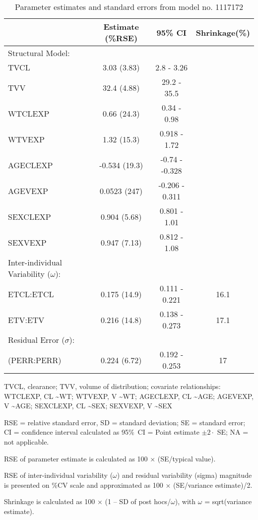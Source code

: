 \begin{table}[ht]
\begin{threeparttable}
\centering
\caption{Parameter estimates and standard errors from model no. 1117172} 
\label{tab:paramsum1117172}
\begingroup\small
\begin{tabular}{lccc}
  \hline
 & Estimate (\%RSE) & 95\% CI & Shrinkage(\%) \\ 
  \hline
Structural Model: &  &  &  \\ 
  TVCL & 3.03 (3.83) & 2.8 - 3.26 &  \\ 
  TVV & 32.4 (4.88) & 29.2 - 35.5 &  \\ 
  WTCLEXP & 0.66 (24.3) & 0.34 - 0.98 &  \\ 
  WTVEXP & 1.32 (15.3) & 0.918 - 1.72 &  \\ 
  AGECLEXP & -0.534 (19.3) & -0.74 - -0.328 &  \\ 
  AGEVEXP & 0.0523 (247) & -0.206 - 0.311 & \\ 
  SEXCLEXP & 0.904 (5.68) & 0.801 - 1.01 &  \\ 
  SEXVEXP & 0.947 (7.13) & 0.812 - 1.08 &  \\ 
  Inter-individual Variability ($\omega$): &  &  &  \\ 
  ETCL:ETCL & 0.175 (14.9) & 0.111 - 0.221 & 16.1 \\ 
  ETV:ETV & 0.216 (14.8) & 0.138 - 0.273 & 17.1 \\ 
  Residual Error ($\sigma$): &  &  &  \\ 
   (PERR:PERR) & 0.224 (6.72) & 0.192 - 0.253 & 17 \\ 
   \hline
\end{tabular}
\endgroup
\begin{tablenotes}\footnotesize
\item[] TVCL, clearance; TVV, volume of distribution; covariate relationships: WTCLEXP, CL \textasciitilde WT; WTVEXP, V \textasciitilde WT; AGECLEXP, CL \textasciitilde AGE; AGEVEXP, V \textasciitilde AGE; SEXCLEXP, CL \textasciitilde SEX; SEXVEXP, V \textasciitilde SEX
\item[] RSE = relative standard error, SD = standard deviation; SE = standard error; CI = confidence interval calculated as 95\%~CI = Point estimate $\pm 2 \cdot$ SE; NA = not applicable.
\item[] RSE of parameter estimate is calculated as 100 × (SE/typical value).
\item[] RSE of inter-individual variability ($\omega$) and residual variability (sigma) magnitude  is presented on \%CV scale and approximated as 100 × (SE/variance estimate)/2.
\item[] Shrinkage is calculated as 100 × (1 – SD of post hocs/$\omega$), with $\omega$ = sqrt(variance estimate).
\end{tablenotes}
\end{threeparttable}
\end{table}
